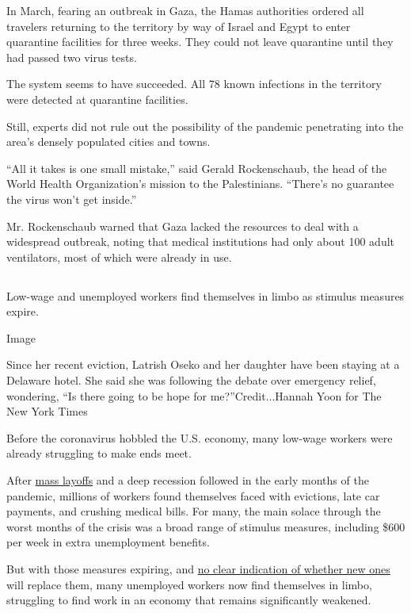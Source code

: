 In March, fearing an outbreak in Gaza, the Hamas authorities ordered all
travelers returning to the territory by way of Israel and Egypt to enter
quarantine facilities for three weeks. They could not leave quarantine
until they had passed two virus tests.

The system seems to have succeeded. All 78 known infections in the
territory were detected at quarantine facilities.

Still, experts did not rule out the possibility of the pandemic
penetrating into the area's densely populated cities and towns.

``All it takes is one small mistake,'' said Gerald Rockenschaub, the
head of the World Health Organization's mission to the Palestinians.
``There's no guarantee the virus won't get inside.''

Mr. Rockenschaub warned that Gaza lacked the resources to deal with a
widespread outbreak, noting that medical institutions had only about 100
adult ventilators, most of which were already in use.

\hypertarget{section-5}{%
\subsection{}\label{section-5}}

Low-wage and unemployed workers find themselves in limbo as stimulus
measures expire.

Image

Since her recent eviction, Latrish Oseko and her daughter have been
staying at a Delaware hotel. She said she was following the debate over
emergency relief, wondering, ``Is there going to be hope for
me?''Credit...Hannah Yoon for The New York Times

Before the coronavirus hobbled the U.S. economy, many low-wage workers
were already struggling to make ends meet.

After
\href{https://www.nytimes.com/interactive/2020/08/05/upshot/us-unemployment-maps-coronavirus.html}{mass
layoffs} and a deep recession followed in the early months of the
pandemic, millions of workers found themselves faced with evictions,
late car payments, and crushing medical bills. For many, the main solace
through the worst months of the crisis was a broad range of stimulus
measures, including \$600 per week in extra unemployment benefits.

But with those measures expiring, and
\href{https://www.nytimes.com/2020/08/07/us/politics/trump-congress-stimulus.html}{no
clear indication of whether new ones} will replace them, many unemployed
workers now find themselves in limbo, struggling to find work in an
economy that remains significantly weakened.

